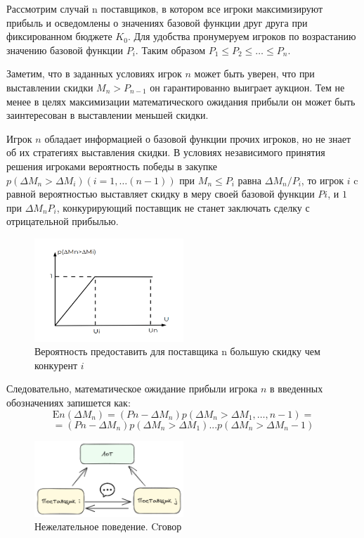 Рассмотрим случай n поставщиков, в котором все игроки максимизируют прибыль и осведомлены о значениях базовой функции друг друга при фиксированном бюджете $K_0$. Для удобства пронумеруем игроков по возрастанию значению базовой функции $P_i$. Таким образом $P_1 \le P_2 \le \dots \le P_n$.

Заметим, что в заданных условиях игрок $n$ может быть уверен, что при выставлении скидки $M_{n} >P_{n-1}$ он гарантированно выиграет аукцион. Тем не менее в целях максимизации математического ожидания прибыли он может быть заинтересован в выставлении меньшей скидки.

Игрок $n$ обладает информацией о базовой функции прочих игроков, но не знает об их стратегиях выставления скидки. В условиях независимого принятия решения игроками вероятность победы в закупке $p(\Delta M_n > \Delta M_i) (i = 1, … (n-1))$ при $M_n \le P_i$ равна $\Delta M_n/P_i$,  
то игрок $i$ c равной вероятностью выставляет скидку в меру своей базовой функции $Pi$, и $1$ при $\Delta M_nP_i$, конкурирующий поставщик не станет заключать сделку с отрицательной прибылью.

\begin{figure}[h]
	\centering
	\includegraphics[width=0.5\textwidth]{assets/settings/probability_sale.excalidraw.png}
	\caption{Вероятность предоставить для поставщика n большую скидку чем конкурент $i$}
\end{figure}
Следовательно, математическое ожидание прибыли игрока $n$ в введенных обозначениях запишется как:
\begin{equation}
	\mathrm{E} n(\Delta M_n) =(Pn-\Delta M_n)p(\Delta M_n>\Delta M_1,\dots,n-1)=
\end{equation}
\begin{equation}
	=(Pn-\Delta M_n)p(\Delta M_n >\Delta M_1)...p(\Delta M_n >\Delta M_n-1) 
\end{equation}


\begin{figure}[h]
    \centering
    \includegraphics[width=0.5\textwidth]{assets/settings/collusion.excalidraw.png}
    \caption{Нежелательное поведение. Cговор}
\end{figure}

